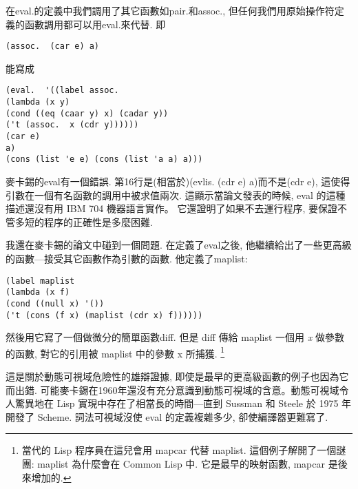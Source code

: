 \documentclass[12pt]{article}
\begin{document}
\begin{CJK}{UTF8}{bsmi}
在eval.的定義中我們調用了其它函數如pair.和assoc.,
但任何我們用原始操作符定義的函數調用都可以用eval.來代替. 
即 
\begin{verbatim} 
(assoc.  (car e) a) 
\end{verbatim} 
能寫成 
\begin{verbatim} 
(eval.  '((label assoc. 
(lambda (x y) 
(cond ((eq (caar y) x) (cadar y)) 
('t (assoc.  x (cdr y)))))) 
(car e) 
a) 
(cons (list 'e e) (cons (list 'a a) a))) 
\end{verbatim} 
麥卡錫的eval有一個錯誤. 
第16行是(相當於)(evlis.  (cdr e) a)而不是(cdr e), 
這使得引數在一個有名函數的調用中被求值兩次. 
這顯示當論文發表的時候, 
eval 的這種描述還沒有用 IBM 704 機器語言實作。
它還證明了如果不去運行程序, 
要保證不管多短的程序的正確性是多麼困難. 

我還在麥卡錫的論文中碰到一個問題. 
在定義了eval之後, 
他繼續給出了一些更高級的函數---接受其它函數作為引數的函數. 
他定義了maplist: 
\begin{verbatim} 
(label maplist 
(lambda (x f) 
(cond ((null x) '()) 
('t (cons (f x) (maplist (cdr x) f)))))) 
\end{verbatim} 
然後用它寫了一個做微分的簡單函數diff. 
但是 diff 傳給 maplist 一個用 {\it x} 做參數的函數, 
對它的引用被 maplist 中的參數 x 所捕獲.
\footnote{當代的 Lisp 程序員在這兒會用 mapcar 代替 maplist. 
這個例子解開了一個謎團: 
maplist 為什麼會在 Common Lisp 中. 
它是最早的映射函數, mapcar 是後來增加的.} 

這是關於動態可視域危險性的雄辯證據, 
即使是最早的更高級函數的例子也因為它而出錯. 
可能麥卡錫在1960年還沒有充分意識到動態可視域的含意。動態可視域令人驚異地在
Lisp 實現中存在了相當長的時間---直到 Sussman 和 Steele 於 1975 年開發了 Scheme. 
詞法可視域沒使 eval 的定義複雜多少, 卻使編譯器更難寫了. 
\newpage 
\end{CJK} 
\end{document}
